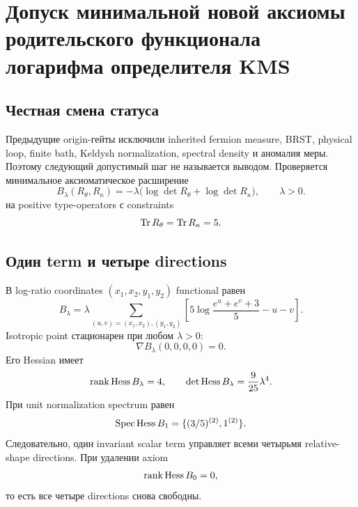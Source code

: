 \chapter{Допуск минимальной новой аксиомы родительского функционала логарифма определителя KMS}
\label{ch:v9-kms-minimal-logdet-axiom}

\section{Честная смена статуса}

Предыдущие origin-гейты исключили inherited fermion measure, BRST,
physical loop, finite bath, Keldysh normalization, spectral density и
аномалия меры. Поэтому следующий допустимый шаг не называется выводом.
Проверяется минимальное аксиоматическое расширение
\begin{equation}
 B_\lambda(R_\theta,R_\kappa)
 =-\lambda\bigl(\log\det R_\theta+\log\det R_\kappa\bigr),
 \qquad \lambda>0.
 \label{eq:v9-kms-axiom-functional}
\end{equation}
на positive type-operators с constraints
\begin{equation}
 \operatorname{Tr} R_\theta=\operatorname{Tr} R_\kappa=5.
 \label{eq:v9-kms-axiom-traces}
\end{equation}

\section{Один term и четыре directions}

В log-ratio coordinates $(x_1,x_2,y_1,y_2)$ functional равен
\begin{equation}
 B_\lambda=\lambda\sum_{(u,v)=(x_1,x_2),(y_1,y_2)}
 \left[5\log\frac{e^u+e^v+3}{5}-u-v\right].
 \label{eq:v9-kms-axiom-log-chart}
\end{equation}
Isotropic point стационарен при любом $\lambda>0$:
\begin{equation}
 \nabla B_\lambda(0,0,0,0)=0.
 \label{eq:v9-kms-axiom-stationarity}
\end{equation}
Его Hessian имеет
\begin{equation}
 \operatorname{rank}\operatorname{Hess} B_\lambda=4,
 \qquad
 \det\operatorname{Hess} B_\lambda=\frac9{25}\lambda^4.
 \label{eq:v9-kms-axiom-hessian}
\end{equation}
При unit normalization spectrum равен
\begin{equation}
 \operatorname{Spec}\operatorname{Hess} B_1=\{(3/5)^{(2)},1^{(2)}\}.
 \label{eq:v9-kms-axiom-spectrum}
\end{equation}
Следовательно, один invariant scalar term управляет всеми четырьмя
relative-shape directions. При удалении axiom
\begin{equation}
 \operatorname{rank}\operatorname{Hess} B_0=0,
 \label{eq:v9-kms-axiom-zero-rank}
\end{equation}
то есть все четыре directions снова свободны.

